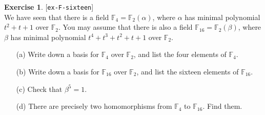\documentclass{amsart}
\newcommand{\F}         {{\mathbb{F}}}
\newcommand{\al}        {\alpha}
\newcommand{\bt}        {\beta}
\renewcommand{\:}{\colon}
\newcommand{\lastexlabel}{}
\newcommand{\exlabel}[1]{
 \global\def\lastexlabel{#1}\label{#1}[\texttt{#1}]\ \\
}
\newcommand{\exlabel}[1]{
 \global\def\lastexlabel{#1}\label{#1}
}
\theoremstyle{definition}
\newtheorem{exercise}{Exercise}[section]
\begin{document}
\begin{exercise}\exlabel{ex-F-sixteen}
 We have seen that there is a field $\F_4=\F_2(\al)$, where $\al$ has
 minimal polynomial $t^2+t+1$ over $\F_2$.  You may assume that there
 is also a field $\F_{16}=\F_2(\bt)$, where $\bt$ has minimal
 polynomial $t^4+t^3+t^2+t+1$ over $\F_2$.
 \begin{itemize}
  \item[(a)] Write down a basis for $\F_4$ over $\F_2$, and list the
   four elements of $\F_4$.
  \item[(b)] Write down a basis for $\F_{16}$ over $\F_2$, and list the
   sixteen elements of $\F_{16}$.
  \item[(c)] Check that $\bt^5=1$.
  \item[(d)] There are precisely two homomorphisms from $\F_4$ to
   $\F_{16}$.  Find them.
 \end{itemize}
\end{exercise}
\end{document}
